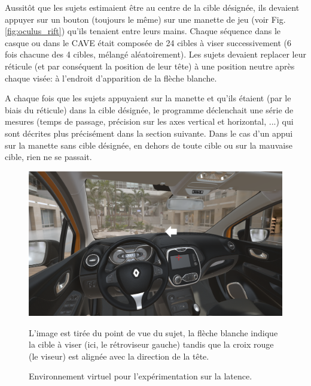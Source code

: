 	\par Aussitôt que les sujets estimaient être au centre de la cible désignée, ils devaient appuyer sur un bouton (toujours le même) sur une manette de jeu (voir Fig. \ref{fig:oculus_rift}) qu'ils tenaient entre leurs mains. Chaque séquence dans le casque ou dans le CAVE était composée de 24 cibles à viser successivement (6 fois chacune des 4 cibles, mélangé aléatoirement). Les sujets devaient replacer leur réticule (et par conséquent la position de leur tête) à une position neutre après chaque visée: à l'endroit d'apparition de la flèche blanche.
	
	\par A chaque fois que les sujets appuyaient sur la manette et qu'ils étaient (par le biais du réticule) dans la cible désignée, le programme déclenchait une série de mesures (temps de passage, précision sur les axes vertical et horizontal, ...) qui sont décrites plus précisément dans la section suivante. Dans le cas d'un appui sur la manette sans cible désignée, en dehors de toute cible ou sur la mauvaise cible, rien ne se passait.
	
	\begin{figure}
		\centering
		\includegraphics[scale=.9]{Figures/ExpeLatency}
		\caption{Environnement virtuel pour l'expérimentation sur la latence.}{L'image est tirée du point de vue du sujet, la flèche blanche indique la cible à viser (ici, le rétroviseur gauche) tandis que la croix rouge (le viseur) est alignée avec la direction de la tête.}
		\label{fig:apparatus_latency}
	\end{figure}
	

